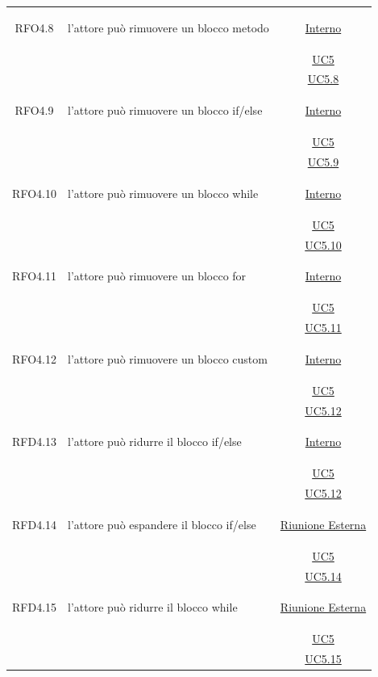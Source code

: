 \begin{longtable}{|c|>{\centering}m{7cm}|c|}
\hypertarget{RFO4.8}{RFO4.8} & l'attore può rimuovere un blocco metodo & \hyperlink{Interno}{Interno}\\
& &\hyperref[UC5]{UC5}\\
& &\hyperref[UC5.8]{UC5.8}\\ \hline

\hypertarget{RFO4.9}{RFO4.9} & l'attore può rimuovere un blocco if/else & \hyperlink{Interno}{Interno}\\
& &\hyperref[UC5]{UC5}\\
& &\hyperref[UC5.9]{UC5.9}\\ \hline

\hypertarget{RFO4.10}{RFO4.10} & l'attore può rimuovere un blocco while & \hyperlink{Interno}{Interno}\\
& &\hyperref[UC5]{UC5}\\
& & \hyperref[UC5.10]{UC5.10}\\ \hline

\hypertarget{RFO4.11}{RFO4.11} & l'attore può rimuovere un blocco for & \hyperlink{Interno}{Interno}\\
& &\hyperref[UC5]{UC5}\\
& &\hyperref[UC5.11]{UC5.11}\\ \hline

\hypertarget{RFO4.12}{RFO4.12} & l'attore può rimuovere un blocco custom & \hyperlink{Interno}{Interno}\\
& &\hyperref[UC5]{UC5}\\
& &\hyperref[UC5.12]{UC5.12}\\ \hline

\hypertarget{RFD4.13}{RFD4.13} & l'attore può ridurre il blocco if/else & \hyperlink{Interno}{Interno}\\
& &\hyperref[UC5]{UC5}\\
& &\hyperref[UC5.12]{UC5.12}\\ \hline

\hypertarget{RFD4.14}{RFD4.14} & l'attore può espandere il blocco if/else & \hyperlink{Riunione Esterna}{Riunione Esterna}\\
& &\hyperref[UC5]{UC5}\\
& &\hyperref[UC5.14]{UC5.14}\\ \hline

\hypertarget{RFD4.15}{RFD4.15} & l'attore può ridurre il blocco while & \hyperlink{Riunione Esterna}{Riunione Esterna}\\
& &\hyperref[UC5]{UC5}\\
& &\hyperref[UC5.15]{UC5.15}\\ \hline


\end{longtable}
